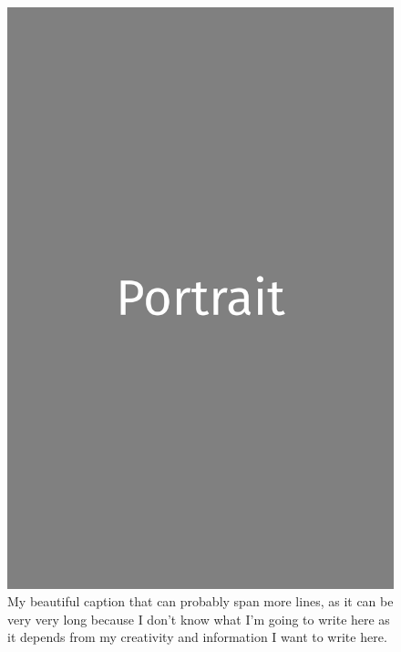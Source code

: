 \documentclass[a4paper,twoside]{book}
\begin{document}
\begin{figure}[H]
	\includegraphics[width=\textwidth]{portrait.png}
	\caption{My beautiful caption that can probably span more lines, as it can be very very long because I don't know what I'm going to write here as it depends from my creativity and information I want to write here.}
\end{figure}

\clearpage 
\end{document}
